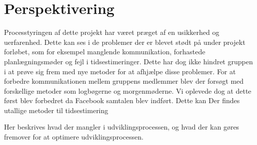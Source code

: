 


\chapter{Perspektivering}
Processtyringen af dette projekt har været præget af en usikkerhed og uerfarenhed. Dette kan ses i de problemer der er blevet stødt på under projekt forløbet, som for eksempel manglende kommunikation, forhastede planlægningsmøder og fejl i tidsestimeringer. Dette har dog ikke hindret gruppen i at prøve sig frem med nye metoder for at afhjælpe disse problemer. 
For at forbedre kommunikationen mellem gruppens medlemmer blev der forsøgt med forskellige metoder som logbøgerne og morgenmøderne. Vi oplevede dog at dette først blev forbedret da Facebook samtalen blev indført. 
Dette kan 
Der findes utallige metoder til tidsestimering 

Her beskrives hvad der mangler i udviklingsprocessen, og hvad der kan gøres
fremover for at optimere udviklingsprocessen. 